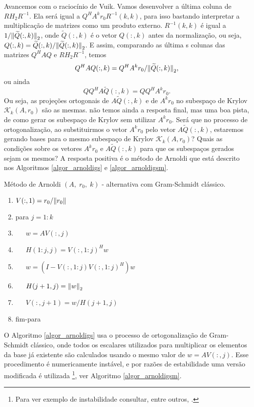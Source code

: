 {
     Avancemos  com o raciocínio de Vuik. Vamos desenvolver a  última  coluna de $RH_2R^{-1}$.
     Ela será  igual a $Q^HA^kr_0R^{-1}(k,k)$, para isso bastando interpretar a multiplicação de matrizes como um produto externo.  $R^{-1}(k,k)$ é igual a $1/{\Vert \widetilde{Q}(:,k)\Vert}_2$, onde $\widetilde{Q}(:,k)$ é o vetor ${Q}(:,k)$ antes da normalização, ou seja, ${Q}(:,k)=\widetilde{Q}(:,k)/{\Vert \widetilde{Q}(:,k)\Vert}_2$. E assim, comparando as  última s colunas das matrizes $Q^HAQ$ e $RH_2R^{-1}$, temos
     \[
     Q^HA{Q}(:,k)=Q^HA^kr_0/{\Vert \widetilde{Q}(:,k)\Vert}_2,
     \]
     ou ainda
     \[QQ^HA\widetilde{Q}(:,k)=QQ^HA^kr_0.\]
     Ou seja, as projeções ortogonais de $A\widetilde{Q}(:,k)$ e de $A^kr_0$ no subespaço de Krylov $\mathcal{K}_k(A,r_0)$ são  as mesmas. não temos ainda a resposta final, mas uma boa pista, de como gerar os subespaço de Krylov sem utilizar $A^kr_0$. Será que no processo de ortogonalização, ao substituirmos  o vetor $A^kr_0$ pelo vetor $A\widetilde{Q}(:,k)$, estaremos gerando bases para o mesmo subespaço de Krylov $\mathcal{K}_k(A,r_0)$? Quais as condições sobre os vetores $A^kr_0$ e $A\widetilde{Q}(:,k)$ para que os subespaços gerados sejam os mesmos? A resposta positiva é o método de Arnoldi que está descrito nos Algoritmos \ref{algor_arnoldigs} e \ref{algor_arnoldigsm}.
}
     \begin{algor}[htb]
\caption{ Método  de Arnoldi $(A,\;r_0,\;k)$ - alternativa com Gram-Schmidt clássico.} \label{algor_arnoldigs}

{%
\begin{enumerate}
\renewcommand{\labelenumi}{\theenumi:}
\setlength{\itemsep}{.01cm}
\item $V(:,1)=r_0/{\Vert r_0\Vert}$
\item para $j=1:k$
\item~~~$w=AV(:,j)$
\item~~~$H(1:j,j)=V(:,1:j)^Hw$
\item~~~$w=(I-V(:,1:j)V(:,1:j)^H)w$
\item~~~$H(j+1,j)={\Vert w\Vert}_2$
\item~~~$V(:,j+1)=w/H(j+1,j)$
\item fim-para
\renewcommand{\labelenumi}{\theenumi.}
\end{enumerate}
}
\end{algor}
O Algoritmo \ref{algor_arnoldigs} usa o processo de ortogonalização de Gram-Schmidt clássico, onde todos os escalares  utilizados para multiplicar os elementos da base já  existente são  calculados usando o mesmo valor de $w=AV(:,j)$. Esse procedimento é numericamente instável, e por razões de estabilidade uma versão  modificada é utilizada \cite{Stewart1973Introduction}\footnote{Para ver exemplo de instabilidade consultar, entre outros, \cite[exemplo 5.5.5, pág. 316]{Meyer00Matrix}.}, ver Algoritmo \ref{algor_arnoldigsm}.
